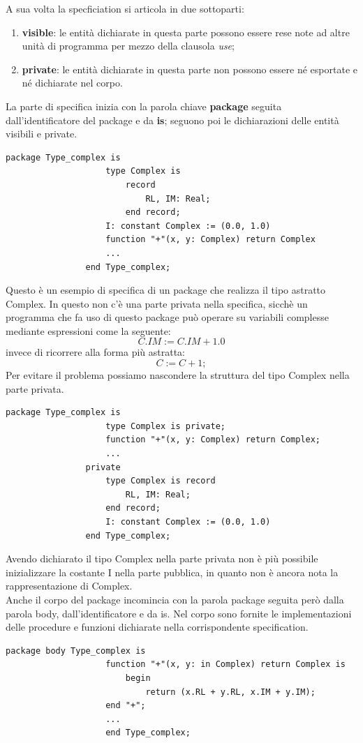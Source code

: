 \documentclass[12pt]{report}
\begin{document}
			A sua volta la specficiation si articola in due sottoparti:
			\begin{enumerate}
				\item \textbf{visible}: le entità dichiarate in questa parte possono essere rese note ad altre unità di programma per mezzo della clausola \textit{use};
				\item \textbf{private}: le entità dichiarate in questa parte non possono essere né esportate e né dichiarate nel corpo.
			\end{enumerate}
			La parte di specifica inizia con la parola chiave \textbf{package} seguita dall'identificatore del package e da \textbf{is}; seguono poi le dichiarazioni delle entità visibili e private.
			\begin{lstlisting}[style=adastyle]
				package Type_complex is
					type Complex is
						record
							RL, IM: Real;
						end record;
					I: constant Complex := (0.0, 1.0)
					function "+"(x, y: Complex) return Complex
					...
				end Type_complex;\end{lstlisting}
			Questo è un esempio di specifica di un package che realizza il tipo astratto Complex. In questo non c'è una parte privata nella specifica, sicchè un programma che fa uso di questo package può operare su variabili complesse mediante espressioni come la seguente:
			\[
			C.IM := C.IM + 1.0
			\]
			invece di ricorrere alla forma più astratta:
			\[
			C := C + 1;
			\]
			Per evitare il problema possiamo nascondere la struttura del tipo Complex nella parte privata.
			\begin{lstlisting}[style=adastyle]
				package Type_complex is
					type Complex is private;
					function "+"(x, y: Complex) return Complex;
					...
				private
					type Complex is record
						RL, IM: Real;
					end record;
					I: constant Complex := (0.0, 1.0)
				end Type_complex; \end{lstlisting}
			Avendo dichiarato il tipo Complex nella parte privata non è più possibile inizializzare la costante I nella parte pubblica, in quanto non è ancora nota la rappresentazione di Complex. \\
			Anche il corpo del package incomincia con la parola package seguita però dalla parola body, dall'identificatore e da is. Nel corpo sono fornite le implementazioni delle procedure e funzioni dichiarate nella corrispondente specification.
			\begin{lstlisting}[style=adastyle]
				package body Type_complex is
					function "+"(x, y: in Complex) return Complex is
						begin
							return (x.RL + y.RL, x.IM + y.IM);
					end "+";
					...
					end Type_complex;\end{lstlisting}
\end{document}
